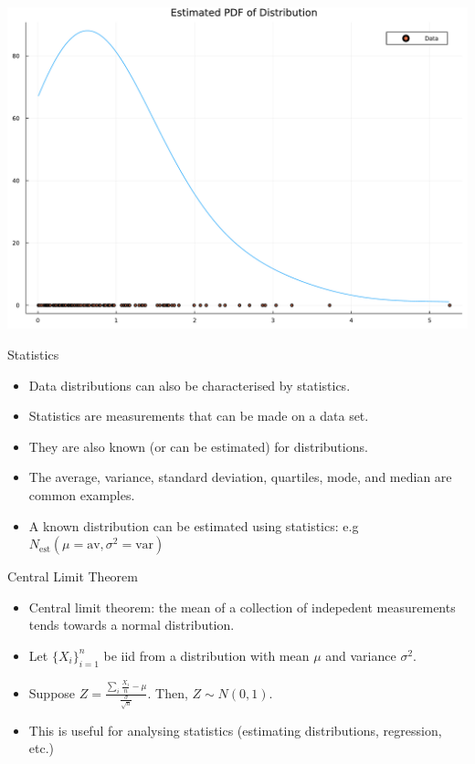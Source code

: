 \documentclass[
  ignorenonframetext,
]{beamer}
\begin{document}
\begin{frame}{}
\protect\hypertarget{section-1}{}
\includegraphics{lecture1_files/figure-beamer/cell-4-output-1.pdf}
\end{frame}

\begin{frame}{Statistics}
\protect\hypertarget{statistics}{}
\begin{itemize}
\item
  Data distributions can also be characterised by statistics.
\item
  Statistics are measurements that can be made on a data set.
\item
  They are also known (or can be estimated) for distributions.
\item
  The average, variance, standard deviation, quartiles, mode, and median
  are common examples.
\item
  A known distribution can be estimated using statistics: e.g
  \(N_{\text{est}}(\mu = \text{av}, \sigma^2 = \text{var})\)
\end{itemize}
\end{frame}

\begin{frame}{Central Limit Theorem}
\protect\hypertarget{central-limit-theorem}{}
\begin{itemize}
\item
  Central limit theorem: the mean of a collection of indepedent
  measurements tends towards a normal distribution.
\item
  Let \(\{X_i\}^n_{i=1}\) be iid from a distribution with mean \(\mu\)
  and variance \(\sigma^2\).
\item
  Suppose
  \(Z = \frac{\sum_i \frac{X_i}{n} - \mu}{\frac{\sigma}{\sqrt{n}}}\).
  Then, \(Z \sim N(0,1)\).
\item
  This is useful for analysing statistics (estimating distributions,
  regression, etc.)
\end{itemize}
\end{frame}
\end{document}
